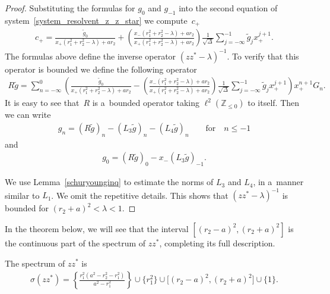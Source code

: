 \begin{proof}
Substituting the formulas for $g_{0}$ and $g_{-1}$ into the second equation of system~\eqref{system_resolvent_z_z_star}
we com\-pu\-te~$c_+$
\begin{gather*}
c_+=\frac{\tilde{g}_0}{x_+(r_1^2+r_2^2-\lambda)+ar_2}+\left(\frac{{x_-(r_1^2+r_2^2-\lambda)+ar_2}}{x_+(r_1^2
+r_2^2-\lambda)+ar_2}\right) \frac{1}{\sqrt{\Delta}}\sum\limits_{j=-\infty}^{-1}\tilde{g}_jx_+^{j+1}.
\end{gather*}
The formulas above def\/ine the inverse operator $(zz^*-\lambda)^{-1}$.
To verify that this operator is bounded we def\/ine the following operator
\begin{gather*}
R\tilde{g}=\!\sum\limits_{n=-\infty}^0\!\!\left(\!\frac{\tilde{g}_0}{x_+(r_1^2+r_2^2-\lambda)+ar_2}-
\left(\frac{{x_-(r_1^2+r_2^2-\lambda)+ar_2}}{x_+(r_1^2+r_2^2-\lambda)+ar_2}\right)\!
\frac{1}{\sqrt{\Delta}}\sum\limits_{j=-\infty}^{-1}\!\!\tilde{g}_jx_+^{j+1}\!\right)\!x_+^{n+1}G_n.
\end{gather*}
It is easy to see that~$R$ is a~bounded operator taking $\ell^2({\mathbb Z}_{\leq 0})$ to itself.
Then we can write
\begin{gather*}
g_n=\left(R\tilde{g}\right)_n-\left(L_3\tilde{g}\right)_n-\left(L_4\tilde{g}\right)_n \qquad\text{for}\quad  n\leq -1
\end{gather*}
and
\begin{gather*}
g_0 =\left(R\tilde{g}\right)_0-x_-\left(L_3\tilde{g}\right)_{-1}.
\end{gather*}

We use Lemma~\ref{schuryounginq} to estimate the norms of $L_3$ and $L_4$, in a~manner similar to $L_1$.
We omit the repetitive details.
This shows that $(zz^*-\lambda)^{-1}$ is bounded for $(r_2+a)^2<\lambda<1$.
\end{proof}

In the theorem below, we will see that the interval $[(r_2-a)^2,(r_2+a)^2]$ is the continuous part of the spectrum of
$zz^*$, completing its full description.

\begin{Theorem}
The spectrum of $zz^*$ is
\begin{gather*}
\sigma(zz^*)= \left\{\frac{r_1^2(a^2-r_2^2-r_1^2)}{a^2-r_1^2}\right\}\cup\big\{r_1^2\big\}\cup \big[(r_2-a)^2,(r_2+a)^2\big]\cup\{1\}.
\end{gather*}
\end{Theorem}

